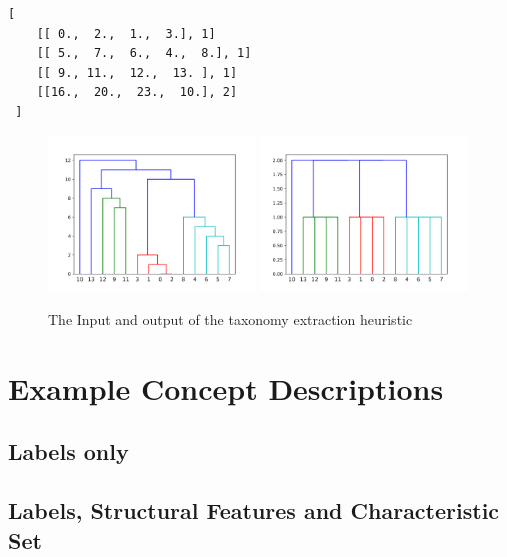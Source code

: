 \hfill
\begin{minipage}{0.48\textwidth}
\begin{verbatim}
[
    [[ 0.,  2.,  1.,  3.], 1]
    [[ 5.,  7.,  6.,  4.,  8.], 1]
    [[ 9., 11.,  12.,  13. ], 1]
    [[16.,  20.,  23.,  10.], 2]       
 ]
 \end{verbatim}
\end{minipage}  
\begin{figure}[htp]
    \includegraphics[width=0.49\textwidth]{img/extract_ex_dendro.png}
        \includegraphics[width=0.49\textwidth]{img/extract_ex_taxo.png}
    \caption{The Input and output of the taxonomy extraction heuristic}
\end{figure} 
\clearpage

\section{Example Concept Descriptions}
\subsection{Labels only}


\subsection{Labels, Structural Features and Characteristic Set}
